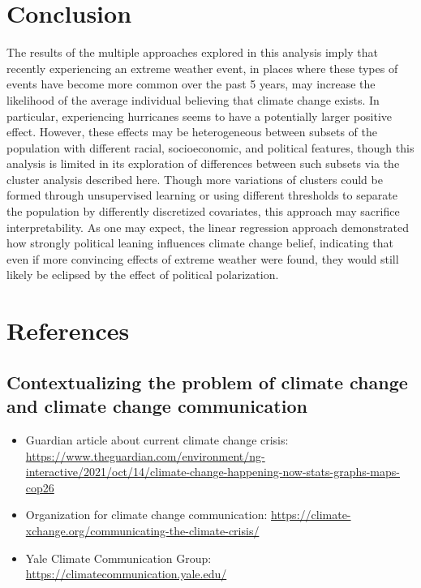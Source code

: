 \documentclass{article}
\begin{document}
\section{Conclusion}
The results of the multiple approaches explored in this analysis imply that recently experiencing an extreme weather event, in places where these types of events have become more common over the past 5 years, may increase the likelihood of the average individual believing that climate change exists. In particular, experiencing hurricanes seems to have a potentially larger positive effect. However, these effects may be heterogeneous between subsets of the population with different racial, socioeconomic, and political features, though this analysis is limited in its exploration of differences between such subsets via the cluster analysis described here. Though more variations of clusters could be formed through unsupervised learning or using different thresholds to separate the population by differently discretized covariates, this approach may sacrifice interpretability. As one may expect, the linear regression approach demonstrated how strongly political leaning influences climate change belief, indicating that even if more convincing effects of extreme weather were found, they would still likely be eclipsed by the effect of political polarization. 

\newpage
\section{References}

\subsection{Contextualizing the problem of climate change and climate change communication}
\begin{itemize}
	\item Guardian article about current climate change crisis: \url{https://www.theguardian.com/environment/ng-interactive/2021/oct/14/climate-change-happening-now-stats-graphs-maps-cop26}
	\item Organization for climate change communication: \url{https://climate-xchange.org/communicating-the-climate-crisis/}
	\item Yale Climate Communication Group: \url{https://climatecommunication.yale.edu/}
\end{itemize}
\end{document}
